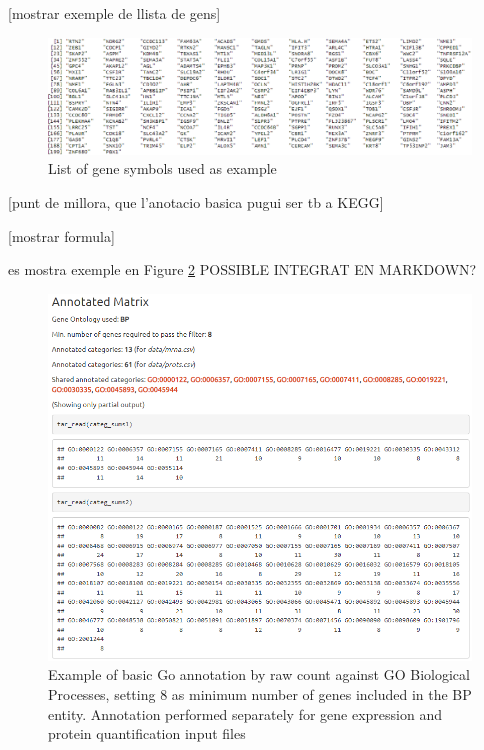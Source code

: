 \documentclass[a4paper, nobind]{templates/ociamthesis}
\begin{document}
{[}mostrar exemple de llista de gens{]}

\begin{figure}

{\centering \includegraphics[width=0.95\linewidth]{figures/chapter3/3-8_gene_list} 

}

\caption{List of gene symbols used as example}\label{fig:fig3-8}
\end{figure}

{[}punt de millora, que l'anotacio basica pugui ser tb a KEGG{]}

{[}mostrar formula{]}

es mostra exemple en Figure \ref{fig:fig3-11} POSSIBLE INTEGRAT EN MARKDOWN?

\begin{figure}

{\centering \includegraphics[width=0.95\linewidth]{figures/chapter3/3-11_basicGO_example} 

}

\caption[Example of basic GO annotation by raw count]{Example of basic Go annotation by raw count against GO Biological Processes, setting 8 as minimum number of genes included in the BP entity. Annotation performed separately for gene expression and protein quantification input files}\label{fig:fig3-11}
\end{figure}
\end{document}
